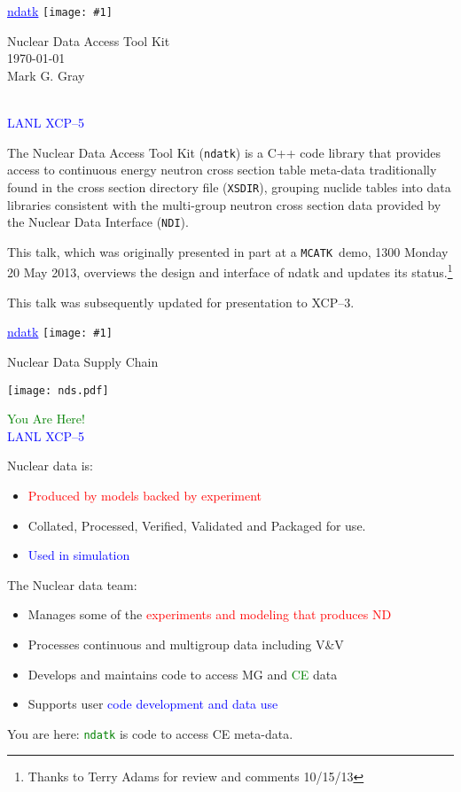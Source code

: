 \documentclass[clock]{slides}
\newenvironment{xslide}[1][logo.jpg]{\begin{slide} \tiny
\textcolor{blue}{\underline{ndatk}} \hfill
\texttt{[image: \#1]}
\normalsize}{\vfill\tiny
\textcolor{blue}{\hrulefill \\LANL XCP--5}
\end{slide}}
\newcommand{\ndatk}{\texttt{ndatk}}
\newcommand{\MCATK}{\texttt{MCATK}}
\newcommand{\NDI}{\texttt{NDI}}
\begin{document}
\begin{xslide}

\begin{center}\Large
Nuclear Data Access Tool Kit\\
\today\\
\vspace{2in}
Mark G. Gray\\ 
\end{center}

\end{xslide}

\begin{note}\small
The Nuclear Data Access Tool Kit (\ndatk) is a C++ code library that
provides access to continuous energy neutron cross section table
meta-data traditionally found in the cross section directory file
(\texttt{XSDIR}), grouping nuclide tables into data libraries
consistent with the multi-group neutron cross section data provided by
the Nuclear Data Interface (\NDI).

This talk, which was originally presented in part at a \MCATK\ demo,
1300 Monday 20 May 2013, overviews the design and interface of ndatk
and updates its status.\footnote{Thanks to Terry Adams for review and
  comments 10/15/13}

This talk was subsequently updated for presentation to XCP--3.
\end{note}

\begin{xslide}
\begin{center}\Large
Nuclear Data Supply Chain
\end{center}

\begin{center}
\texttt{[image: nds.pdf]}
\end{center}
\textcolor{green}{You Are Here!}
\end{xslide}

\begin{note}\small
Nuclear data is:
\begin{itemize}
\item \textcolor{red}{Produced by models backed by experiment}
\item Collated, Processed, Verified, Validated and Packaged for use.
\item \textcolor{blue}{Used in simulation}
\end{itemize}

The Nuclear data team:
\begin{itemize}
\item Manages some of the \textcolor{red}{experiments and modeling
  that produces ND}
\item Processes continuous and multigroup data including V\&V
\item Develops and maintains code to access MG and
  \textcolor{green}{CE} data
\item Supports user \textcolor{blue}{code development and data use}
\end{itemize}

You are here: \textcolor{green}{\ndatk} is code to access CE
meta-data.
\end{note}
\end{document}
